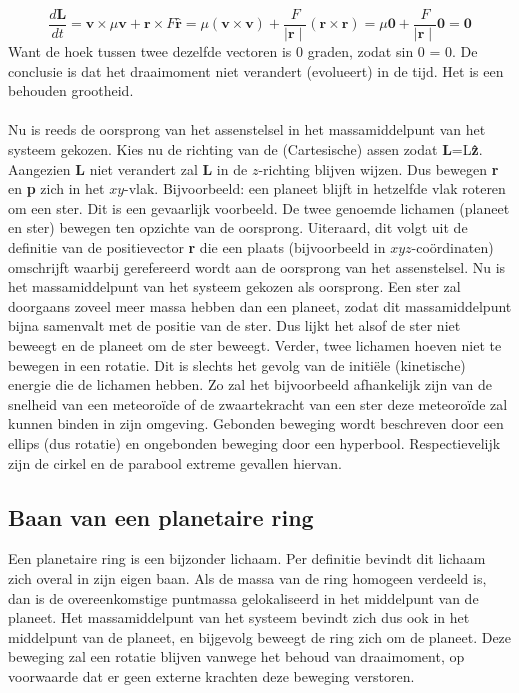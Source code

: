 \documentclass[a4paper]{article}
\begin{document}
	 	\begin{equation}
	 		\frac{d\mathbf{L}}{dt}   = \mathbf{v}\times \mu \mathbf{v}+\mathbf{r}\times F \textbf{\^r} ̂= \mu(\mathbf{v}\times\mathbf{v})+ \frac{F}{\mid \mathbf{r} \mid}(\mathbf{r}\times \mathbf{r})= \mu \mathbf{0}+\frac{F}{\mid \mathbf{r} \mid} \mathbf{0}=\mathbf{0}
		\end{equation}
	 	Want de hoek tussen twee dezelfde vectoren is 0 graden, zodat sin 0 = 0. De conclusie is dat het draaimoment niet verandert (evolueert) in de tijd. Het is een behouden grootheid.\\ \\
	 	Nu is reeds de oorsprong van het assenstelsel in het massamiddelpunt van het systeem gekozen. 
	 	Kies nu de richting van de (Cartesische) assen zodat $\mathbf{L}$=L\textbf{\^z}. 
	 	Aangezien \textbf{L} niet verandert zal \textbf{L} in de $z$-richting blijven wijzen. 
	 	Dus bewegen \textbf{r} en \textbf{p} zich in het $xy$-vlak. 
	 	Bijvoorbeeld: een planeet blijft in hetzelfde vlak roteren om een ster. 
	 	Dit is een gevaarlijk voorbeeld. De twee genoemde lichamen (planeet en ster) 
	 	bewegen ten opzichte van de oorsprong. Uiteraard, dit volgt uit de definitie van de 
	 	positievector \textbf{r} die een plaats (bijvoorbeeld in $xyz$-co\"{o}rdinaten) omschrijft waarbij gerefereerd wordt aan de oorsprong van het assenstelsel. Nu is het massamiddelpunt van het systeem gekozen als oorsprong. Een ster zal doorgaans zoveel meer massa hebben dan een planeet, zodat dit massamiddelpunt bijna samenvalt met de positie van de ster. Dus lijkt het alsof de ster niet beweegt en de planeet om de ster beweegt. Verder, twee lichamen hoeven niet te bewegen in een rotatie. Dit is slechts het gevolg van de initiële (kinetische) energie die de lichamen hebben. Zo zal het bijvoorbeeld afhankelijk zijn van de snelheid van een meteoro\"{i}de of de zwaartekracht van een ster deze meteoro\"{i}de zal kunnen binden in zijn omgeving. Gebonden beweging wordt beschreven door een ellips (dus rotatie) en ongebonden beweging door een hyperbool. Respectievelijk zijn de cirkel en de parabool extreme gevallen hiervan.
	\subsection{Baan van een planetaire ring}
	Een planetaire ring is een bijzonder lichaam. Per definitie bevindt dit lichaam zich overal in zijn eigen baan. Als de massa van de ring homogeen verdeeld is, dan is de overeenkomstige puntmassa gelokaliseerd in het middelpunt van de planeet. Het massamiddelpunt van het systeem bevindt zich dus ook in het middelpunt van de planeet, en bijgevolg beweegt de ring zich om de planeet. Deze beweging zal een rotatie blijven vanwege het behoud van draaimoment, op voorwaarde dat er geen externe krachten deze beweging verstoren.\\
	
\end{document}
